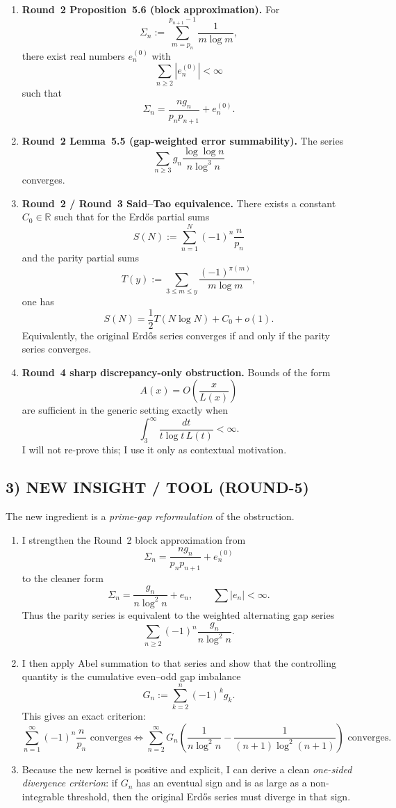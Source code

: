 \begin{enumerate}
\item \textbf{Round~2 Proposition~5.6 (block approximation).}
For
\[
\Sigma_n:=\sum_{m=p_n}^{p_{n+1}-1}\frac{1}{m\log m},
\]
there exist real numbers $e_n^{(0)}$ with
\[
\sum_{n\ge 2}|e_n^{(0)}|<\infty
\]
such that
\[
\Sigma_n = \frac{n g_n}{p_n p_{n+1}} + e_n^{(0)}.
\]

\item \textbf{Round~2 Lemma~5.5 (gap-weighted error summability).}
The series
\[
\sum_{n\ge 3} g_n\frac{\log\log n}{n\log^3 n}
\]
converges.

\item \textbf{Round~2 / Round~3 Said--Tao equivalence.}
There exists a constant $C_0\in\mathbb R$ such that for the Erd\H{o}s partial sums
\[
S(N):=\sum_{n=1}^N (-1)^n\frac{n}{p_n}
\]
and the parity partial sums
\[
T(y):=\sum_{3\le m\le y}\frac{(-1)^{\pi(m)}}{m\log m},
\]
one has
\[
S(N)=\frac12 T(N\log N)+C_0+o(1).
\]
Equivalently, the original Erd\H{o}s series converges if and only if the parity series converges.

\item \textbf{Round~4 sharp discrepancy-only obstruction.}
Bounds of the form
\[
A(x)=O\!\left(\frac{x}{L(x)}\right)
\]
are sufficient in the generic setting exactly when
\[
\int_3^\infty \frac{dt}{t\log t\,L(t)}<\infty.
\]
I will not re-prove this; I use it only as contextual motivation.
\end{enumerate}

\subsection*{3) NEW INSIGHT / TOOL (ROUND-5)}

The new ingredient is a \emph{prime-gap reformulation} of the obstruction.

\begin{enumerate}
\item I strengthen the Round~2 block approximation from
\[
\Sigma_n = \frac{n g_n}{p_n p_{n+1}} + e_n^{(0)}
\]
to the cleaner form
\[
\Sigma_n = \frac{g_n}{n\log^2 n} + e_n,
\qquad \sum |e_n|<\infty.
\]
Thus the parity series is equivalent to the weighted alternating gap series
\[
\sum_{n\ge 2} (-1)^n \frac{g_n}{n\log^2 n}.
\]

\item I then apply Abel summation to that series and show that the controlling quantity is the cumulative even--odd gap imbalance
\[
G_n:=\sum_{k=2}^n (-1)^k g_k.
\]
This gives an exact criterion:
\[
\sum_{n=1}^\infty (-1)^n\frac{n}{p_n} \text{ converges}
\iff
\sum_{n=2}^\infty G_n\left(\frac{1}{n\log^2 n}-\frac{1}{(n+1)\log^2(n+1)}\right)
\text{ converges}.
\]

\item Because the new kernel is positive and explicit, I can derive a clean \emph{one-sided divergence criterion}: if $G_n$ has an eventual sign and is as large as a non-integrable threshold, then the original Erd\H{o}s series must diverge in that sign.
\end{enumerate}

